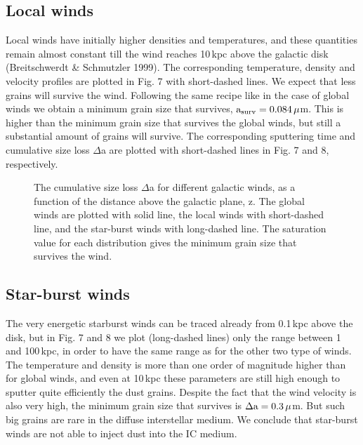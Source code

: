 \documentclass[]{aa}
\begin{document}
\subsection{Local winds}

Local winds have initially higher densities and temperatures, and these 
quantities remain almost constant till the wind reaches 10\,kpc above the 
galactic disk (Breitschwerdt \& Schmutzler 1999). The corresponding 
temperature, 
density and velocity profiles are plotted in Fig. 7 with short-dashed lines. We
expect that less grains will survive the wind. Following the same recipe like
in the case of global winds we obtain a minimum grain size that survives, ${\rm
a_{\rm surv}} = 0.084\,{\mu}$m. This is higher than the minimum grain size 
that survives the global winds, but still a substantial amount of
grains will survive. The corresponding sputtering time and cumulative size
loss ${\Delta}$a are plotted with short-dashed lines in Fig. 7 and 8,
respectively. 

\begin{figure}[hbt]
\caption[]{The cumulative size loss ${\Delta}$a for different galactic winds,
as a function of the distance above the galactic plane, z. The global winds
are plotted with solid line, the local winds with short-dashed line, and the 
star-burst winds with long-dashed line. The saturation value for each 
distribution gives the minimum grain size that survives the wind.}
\end{figure}

\subsection{Star-burst winds}

The very energetic starburst winds can be traced already from 0.1\,kpc above
the disk, but in Fig. 7 and 8 we plot (long-dashed lines) only the range 
between 1 and 100\,kpc, in order to have the same range as for the other two 
type of winds. The temperature and density is more than one order of magnitude
higher than for global winds, and even at 10\,kpc these parameters
are still high enough to sputter quite efficiently the dust grains. 
Despite the fact that the wind velocity is also very high, the minimum grain 
size that
survives is ${\Delta}{\rm a}=0.3\,{\mu}$m. But such big grains
are rare in the diffuse interstellar medium. We conclude that star-burst winds
 are not able to inject dust into the IC 
medium. 
\end{document}
